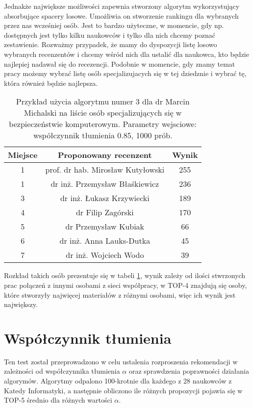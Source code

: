 Jednakże największe możliwości zapewnia stworzony algorytm wykorzystujący absorbujące spacery losowe. Umożliwia on stworzenie rankingu dla wybranych przez nas wcześniej osób. Jest to bardzo użyteczne, w momencie, gdy np. dostępnych jest tylko kilku naukowców i tylko dla nich chcemy poznać zestawienie. Rozważmy przypadek, że mamy do dyspozycji listę losowo wybranych recenzentów i chcemy wśród nich dla ustalić dla naukowca, kto będzie najlepiej nadawał się do recezencji. Podobnie w momencie, gdy znamy temat pracy możemy wybrać listę osób specjalizujacych się w tej dziedznie i wybrać tę, która również będzie najlepsza.


\begin{table}[h]
        \centering
\begin{tabular}{c|c|c}
Miejsce  & Proponowany recenzent & Wynik \\  \hline
1&prof. dr hab. Mirosław Kutyłowski &255 \\
1&dr inż. Przemysław Błaśkiewicz&236 \\
3&dr inż. Łukasz Krzywiecki &189 \\
4&dr Filip Zagórski&170 \\
5&dr Przemysław Kubiak& 66 \\
6&dr inż. Anna Lauks-Dutka& 45 \\
7&dr inż. Wojciech Wodo& 39 \\

\end{tabular}
\caption{Przykład użycia algorytmu numer 3 dla dr Marcin Michalski na liście osób specjalizujących się w bezpieczeństwie komputerowym. Parametry wejsciowe: współczynnik tłumienia 0.85, 1000 prób.}
\label{table:4}
\end{table}

Rozkład takich osób prezentuje się w tabeli \ref{table:4}, wynik zależy od ilości stwrzonych prac połączeń z innymi osobami z sieci współpracy, w TOP-4 znajdują się osoby, które stworzyły najwięcej materiałów z różnymi osobami, więc ich wynik jest największy.


\section{Współczynnik tłumienia}


Ten test został przeprowadzono w celu ustalenia rozproszenia rekomendacji w zależności od współczynnika tłumienia $\alpha$ oraz sprawdzenia poprawności działania algorymów. Algorytmy odpalono 100-krotnie dla każdego z 28 naukowców z Katedy Informatyki, a następnie obliczono ile różnych propozycji pojawia się w TOP-5 średnio dla różnych wartości $\alpha$.

